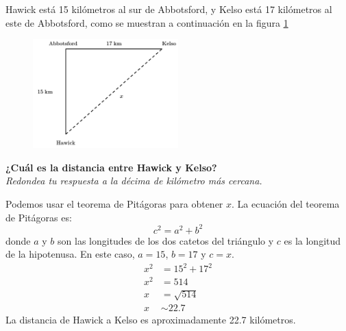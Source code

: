 Hawick está 15 kilómetros al sur de Abbotsford,
y Kelso está 17 kilómetros al este de Abbotsford,
como se muestran a continuación en la figura \ref{fig:proverb_pitagoras_08}
\begin{figure}[H]
    \begin{center}
        \includegraphics[width=0.5\textwidth]{../images/proverb_pitagoras_08.png}
    \end{center}
    \caption{}
    \label{fig:proverb_pitagoras_08}
\end{figure}
\textbf{¿Cuál es la distancia entre Hawick y Kelso?}\\
\textit{Redondea tu respuesta a la décima de kilómetro más cercana.}

\begin{solutionbox}{10cm}
    Podemos usar el teorema de Pitágoras para obtener $x$.
    La ecuación del teorema de Pitágoras es:
    \[c^2=a^2+b^2\]
    donde $a$ y $b$ son las longitudes de los dos catetos del triángulo y $c$ es la longitud de la hipotenusa.
    En este caso, $a=15$, $b=17$ y $c=x$.
    \begin{align*}
        x^2 & =15^2+17^2  \\
        x^2 & =514        \\
        x   & =\sqrt{514} \\
        x   & \sim 22.7
    \end{align*}
    La distancia de Hawick a Kelso es aproximadamente 22.7 kilómetros.
\end{solutionbox}